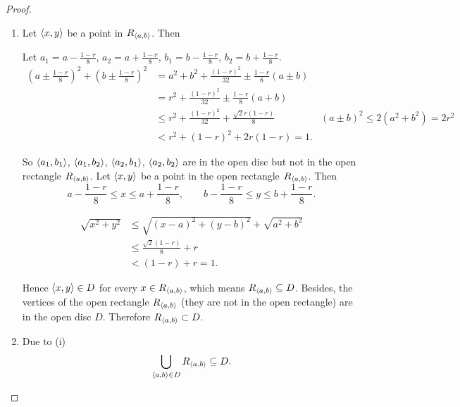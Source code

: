 \begin{proof}
	\begin{enumerate}[label={(\roman*)}]
		\item Let $\left\langle{x, y}\right\rangle$ be a point in $R_{\left\langle{a, b}\right\rangle}$. Then

		      Let $a_{1} = a - \frac{1-r}{8}$, $a_{2} = a + \frac{1-r}{8}$, $b_{1} = b - \frac{1-r}{8}$, $b_{2} = b + \frac{1-r}{8}$.
		      \begin{align*}
			      {\left(a \pm \frac{1-r}{8}\right)}^{2} + {\left(b \pm \frac{1-r}{8}\right)}^{2} & = a^{2} + b^{2} + \frac{{(1-r)}^{2}}{32} \pm \frac{1-r}{8}(a \pm b)                                                \\
			                                                                                      & = r^{2} + \frac{{(1-r)}^{2}}{32} \pm \frac{1-r}{8}(a + b)                                                          \\
			                                                                                      & \leq r^{2} + \frac{{(1-r)}^{2}}{32} + \frac{\sqrt{2}r(1-r)}{8}      & {(a\pm b)}^{2}\leq 2(a^{2} + b^{2}) = 2r^{2} \\
			                                                                                      & < r^{2} + {(1-r)}^{2} + 2r(1-r) = 1.
		      \end{align*}

		      So $\left\langle{a_{1}, b_{1}}\right\rangle$, $\left\langle{a_{1}, b_{2}}\right\rangle$, $\left\langle{a_{2}, b_{1}}\right\rangle$, $\left\langle{a_{2}, b_{2}}\right\rangle$ are in the open disc but not in the open rectangle $R_{\left\langle{a, b}\right\rangle}$. Let $\left\langle{x, y}\right\rangle$ be a point in the open rectangle $R_{\left\langle{a, b}\right\rangle}$. Then
		      \[
			      a - \frac{1-r}{8}\leq x\leq a + \frac{1-r}{8},\qquad b - \frac{1-r}{8}\leq y\leq b + \frac{1-r}{8}.
		      \]

		      \begin{align*}
			      \sqrt{x^{2} + y^{2}} & \leq \sqrt{{(x-a)}^{2} + {(y-b)}^{2}} + \sqrt{a^{2} + b^{2}} \\
			                           & \leq \frac{\sqrt{2}(1-r)}{8} + r                             \\
			                           & < (1 - r) + r = 1.
		      \end{align*}

		      Hence $\left\langle{x, y}\right\rangle\in D$ for every $x\in R_{\left\langle{a, b}\right\rangle}$, which means $R_{\left\langle{a, b}\right\rangle}\subseteq D$. Besides, the vertices of the open rectangle $R_{\left\langle{a, b}\right\rangle}$ (they are not in the open rectangle) are in the open disc $D$. Therefore $R_{\left\langle{a, b}\right\rangle}\subset D$.
		\item Due to (i)
		      \[
			      \bigcup_{\left\langle{a, b}\right\rangle\in D} R_{\left\langle{a, b}\right\rangle}\subseteq D.
		      \]


\end{enumerate}
\end{proof}
